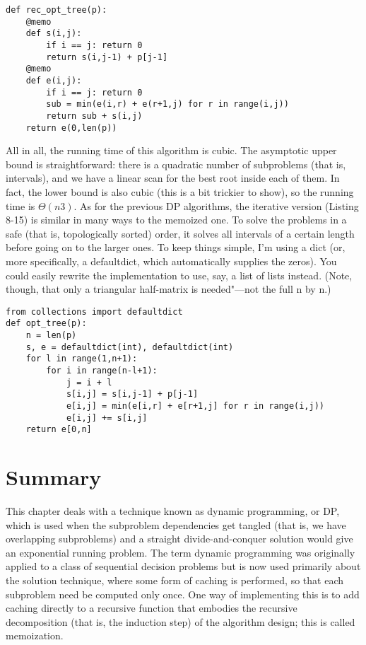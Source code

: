 \begin{lstlisting}[caption={Memoized Recursive Function for Expected Optimal Search Cost}]
def rec_opt_tree(p):
    @memo
    def s(i,j):
        if i == j: return 0
        return s(i,j-1) + p[j-1]
    @memo
    def e(i,j):
        if i == j: return 0
        sub = min(e(i,r) + e(r+1,j) for r in range(i,j))
        return sub + s(i,j)
    return e(0,len(p))
\end{lstlisting}
All in all, the running time of this algorithm is cubic. The asymptotic upper bound is
straightforward: there is a quadratic number of subproblems (that is, intervals), and we have a linear scan for the best root inside each of them. In fact, the lower bound is also cubic (this is a bit trickier to show), so the running time is $\Theta(n3)$.
As for the previous DP algorithms, the iterative version (Listing 8-15) is similar in many ways to the memoized one. To solve the problems in a safe (that is, topologically sorted) order, it solves all intervals of a certain length before going on to the larger ones. To keep things simple, I'm using a dict (or, more specifically, a defaultdict, which automatically supplies the zeros). You could easily rewrite the implementation to use, say, a list of lists instead. (Note, though, that only a triangular half-matrix is needed"---not the full n by n.)

\begin{lstlisting}[caption={An Iterative Solution to the Optimal Search Tree Problem}]
from collections import defaultdict
def opt_tree(p):
    n = len(p)
    s, e = defaultdict(int), defaultdict(int)
    for l in range(1,n+1):
        for i in range(n-l+1):
            j = i + l
            s[i,j] = s[i,j-1] + p[j-1]
            e[i,j] = min(e[i,r] + e[r+1,j] for r in range(i,j))
            e[i,j] += s[i,j]
    return e[0,n]
\end{lstlisting}

\section{Summary}
This chapter deals with a technique known as dynamic programming, or DP, which is used when the
subproblem dependencies get tangled (that is, we have overlapping subproblems) and a straight divide-and-conquer solution would give an exponential running problem. The term dynamic programming was originally applied to a class of sequential decision problems but is now used primarily about the solution technique, where some form of caching is performed, so that each subproblem need be computed only once. One way of implementing this is to add caching directly to a recursive function that embodies the recursive decomposition (that is, the induction step) of the algorithm design; this is called memoization.

